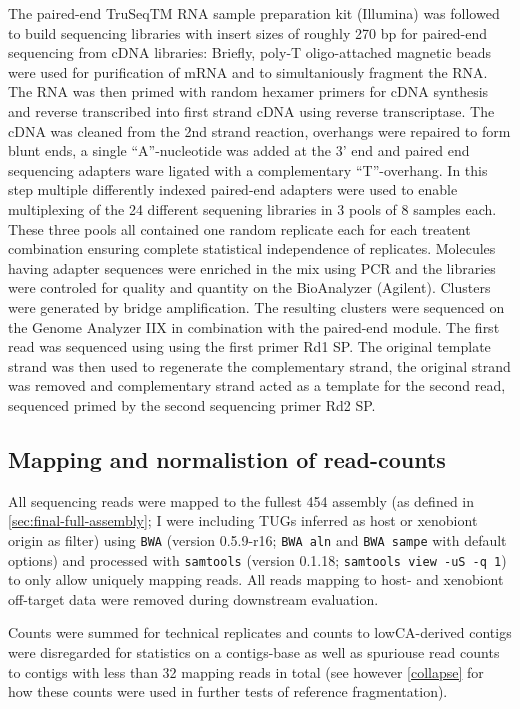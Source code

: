 The paired-end TruSeqTM RNA sample preparation kit (Illumina) was
followed to build sequencing libraries with insert sizes of roughly
270 bp for paired-end sequencing from cDNA libraries: Briefly, poly-T
oligo-attached magnetic beads were used for purification of mRNA and
to simultaniously fragment the RNA. The RNA was then primed with
random hexamer primers for cDNA synthesis and reverse transcribed into
first strand cDNA using reverse transcriptase. The cDNA was cleaned
from the 2nd strand reaction, overhangs were repaired to form blunt
ends, a single ``A''-nucleotide was added at the 3' end and paired end
sequencing adapters ware ligated with a complementary
``T''-overhang. In this step multiple differently indexed paired-end
adapters were used to enable multiplexing of the 24 different
sequening libraries in 3 pools of 8 samples each. These three pools
all contained one random replicate each for each treatent combination
ensuring complete statistical independence of replicates. Molecules
having adapter sequences were enriched in the mix using PCR and the
libraries were controled for quality and quantity on the BioAnalyzer
(Agilent). Clusters were generated by bridge amplification. The
resulting clusters were sequenced on the Genome Analyzer IIX in
combination with the paired-end module. The first read was sequenced
using using the first primer Rd1 SP. The original template strand was
then used to regenerate the complementary strand, the original strand
was removed and complementary strand acted as a template for the
second read, sequenced primed by the second sequencing primer Rd2 SP.

\subsection{Mapping and normalistion of read-counts}

All sequencing reads were mapped to the fullest 454 assembly (as
defined in \ref{sec:final-full-assembly}; I were including TUGs
inferred as host or xenobiont origin as filter) using \texttt{BWA}
\cite{pmid20080505} (version 0.5.9-r16; \texttt{BWA aln} and
\texttt{BWA sampe} with default options) and processed with
\texttt{samtools} \cite{journals/bioinformatics/LiHWFRHMAD09} (version
0.1.18; \texttt{samtools view -uS -q 1}) to only allow uniquely
mapping reads. All reads mapping to host- and xenobiont off-target
data were removed during downstream evaluation.

Counts were summed for technical replicates and counts to
lowCA-derived contigs were disregarded for statistics on a
contigs-base as well as spuriouse read counts to contigs with less
than 32 mapping reads in total (see however \ref{collapse} for how
these counts were used in further tests of reference fragmentation).

